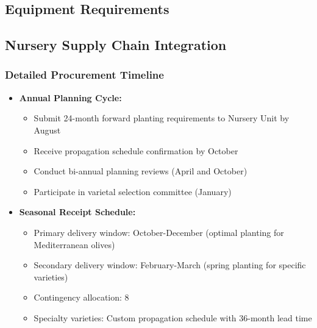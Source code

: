 \subsection{Equipment Requirements}

\subsection{Nursery Supply Chain Integration}

\subsubsection{Detailed Procurement Timeline}
\begin{itemize}
    \item \textbf{Annual Planning Cycle:}
    \begin{itemize}
        \item Submit 24-month forward planting requirements to Nursery Unit by August
        \item Receive propagation schedule confirmation by October
        \item Conduct bi-annual planning reviews (April and October)
        \item Participate in varietal selection committee (January)
    \end{itemize}
    \item \textbf{Seasonal Receipt Schedule:}
    \begin{itemize}
        \item Primary delivery window: October-December (optimal planting for Mediterranean olives)
        \item Secondary delivery window: February-March (spring planting for specific varieties)
        \item Contingency allocation: 8%
        \item Specialty varieties: Custom propagation schedule with 36-month lead time
    \end{itemize}
\end{itemize}

